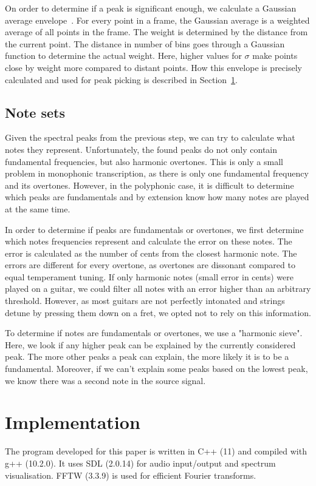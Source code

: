 \documentclass[10pt,twocolumn]{article}
\begin{document}
On order to determine if a peak is significant enough, we calculate a Gaussian average envelope~\cite{gauss}. For every point in a frame, the Gaussian average is a weighted average of all points in the frame. The weight is determined by the distance from the current point. The distance in number of bins goes through a Gaussian function to determine the actual weight. Here, higher values for $\sigma$ make points close by weight more compared to distant points. How this envelope is precisely calculated and used for peak picking is described in Section~\ref{sec:impl}.

\subsection{Note sets}
Given the spectral peaks from the previous step, we can try to calculate what notes they represent. Unfortunately, the found peaks do not only contain fundamental frequencies, but also harmonic overtones. This is only a small problem in monophonic transcription, as there is only one fundamental frequency and its overtones. However, in the polyphonic case, it is difficult to determine which peaks are fundamentals and by extension know how many notes are played at the same time.

In order to determine if peaks are fundamentals or overtones, we first determine which notes frequencies represent and calculate the error on these notes. The error is calculated as the number of cents from the closest harmonic note. The errors are different for every overtone, as overtones are dissonant compared to equal temperament tuning. If only harmonic notes (small error in cents) were played on a guitar, we could filter all notes with an error higher than an arbitrary threshold. However, as most guitars are not perfectly intonated and strings detune by pressing them down on a fret, we opted not to rely on this information.

To determine if notes are fundamentals or overtones, we use a "harmonic sieve". Here, we look if any higher peak can be explained by the currently considered peak. The more other peaks a peak can explain, the more likely it is to be a fundamental. Moreover, if we can't explain some peaks based on the lowest peak, we know there was a second note in the source signal.


\section{Implementation}  \label{sec:impl}
The program developed for this paper is written in C++ (11) and compiled with g++ (10.2.0). It uses SDL (2.0.14) for audio input/output and spectrum visualisation. FFTW (3.3.9) is used for efficient Fourier transforms.
\end{document}
